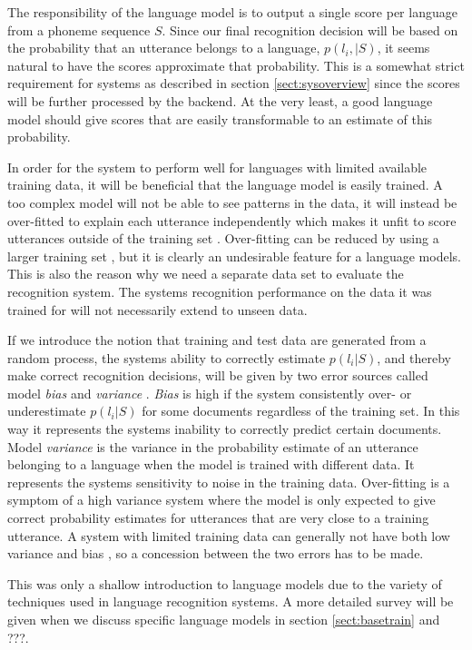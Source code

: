 The responsibility of the language model is to output a single score per language from a phoneme sequence $S$. Since our final recognition decision will be based on the probability that an utterance belongs to a language, $p(l_i, | S)$, it seems natural to have the scores approximate that probability. This is a somewhat strict requirement for systems as described in section \ref{sect:sysoverview} since the scores will be further processed by the backend. At the very least, a good language model should give scores that are easily transformable to an estimate of this probability. 

In order for the system to perform well for languages with limited available training data, it will be beneficial that the language model is easily trained. A too complex model will not be able to see patterns in the data, it will instead be over-fitted to explain each utterance independently which makes it unfit to score utterances outside of the training set \cite[311]{information}. Over-fitting can be reduced by using a larger training set \cite[147]{machinelearningbook}, but it is clearly an undesirable feature for a language models. This is also the reason why we need a separate data set to evaluate the recognition system. The systems recognition performance on the data it was trained for will not necessarily extend to unseen data.

If we introduce the notion that training and test data are generated from a random process, the systems ability to correctly estimate $p(l_i | S)$, and thereby make correct recognition decisions, will be given by two error sources called model \emph{bias} and \emph{variance} \cite[149]{machinelearningbook}. \emph{Bias} is high if the system consistently over- or underestimate $p(l_i | S)$ for some documents regardless of the training set. In this way it represents the systems inability to correctly predict certain documents. Model \emph{variance} is the variance in the probability estimate of an utterance belonging to a language when the model is trained with different data. It represents the systems sensitivity to noise in the training data. Over-fitting is a symptom of a high variance system where the model is only expected to give correct probability estimates for utterances that are very close to a training utterance. A system with limited training data can generally not have both low variance and bias \cite[312]{information}, so a concession between the two errors has to be made.

This was only a shallow introduction to language models due to the variety of techniques used in language recognition systems. A more detailed survey will be given when we discuss specific language models in section \ref{sect:basetrain} and ???.










